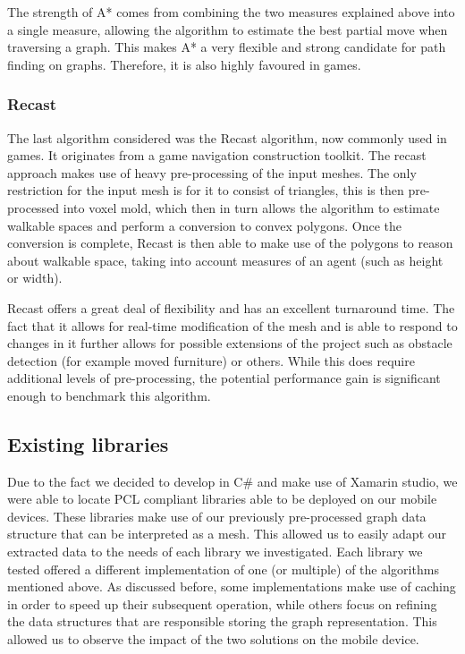 \documentclass[main.tex]{subfiles}
\begin{document}
The strength of A* comes from combining the two measures explained above into a single measure, allowing the algorithm to estimate the best partial move when traversing a graph. This makes A* a very flexible and strong candidate for path finding on graphs. Therefore, it is also highly favoured in games.

\subsubsection{Recast}
The last algorithm considered was the Recast\cite{libRecast} algorithm, now commonly used in games. It originates from a game navigation construction toolkit. The recast approach makes use of heavy pre-processing of the input meshes. The only restriction for the input mesh is for it to consist of triangles, this is then pre-processed into voxel mold, which then in turn allows the algorithm to estimate walkable spaces and perform a conversion to convex polygons. Once the conversion is complete, Recast is then able to make use of the polygons to reason about walkable space, taking into account measures of an agent (such as height or width).
\newline

Recast offers a great deal of flexibility and has an excellent turnaround time. The fact that it allows for real-time modification of the mesh and is able to respond to changes in it further allows for possible extensions of the project such as obstacle detection (for example moved furniture) or others. While this does require additional levels of pre-processing, the potential performance gain is significant enough to benchmark this algorithm.

\subsection{Existing libraries}
Due to the fact we decided to develop in C\# and make use of Xamarin studio, we were able to locate PCL compliant libraries able to be deployed on our mobile devices. These libraries make use of our previously pre-processed graph data structure that can be interpreted as a mesh. This allowed us to easily adapt our extracted data to the needs of each library we investigated. Each library we tested offered a different implementation of one (or multiple) of the algorithms mentioned above. As discussed before, some implementations make use of caching in order to speed up their subsequent operation, while others focus on refining the data structures that are responsible storing the graph representation. This allowed us to observe the impact of the two solutions on the mobile device.
\end{document}
